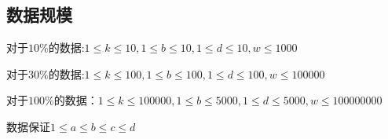 \subsection*{数据规模}

对于$10 \%$的数据:$1 \leq k \leq 10,1\leq b\leq 10,1\leq d\leq 10,w\leq 1000$

对于$30\%$的数据:$1 \leq k \leq 100,1\leq b\leq 100,1\leq d\leq 100,w\leq 100000$

对于$100\%$的数据：$1 \leq k \leq 100000,1\leq b\leq 5000,1\leq d\leq 5000,w\leq 100000000$

数据保证$1\leq a\leq b\leq c\leq d$